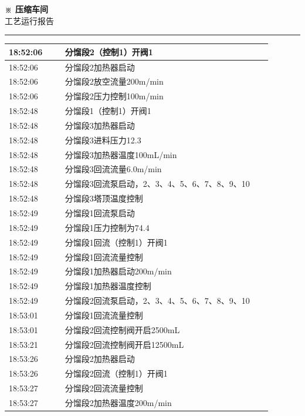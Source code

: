 \documentclass[UTF8,10pt,a4paper,fontset=fandol]{ctexart}
\begin{document}
\newpage

\begin{center}
\begin{minipage}[t]{0.47\linewidth}
\centering
\textbf{※ 压缩车间}\\[-1mm]
工艺运行报告

\vspace{1mm}
\hrule
\vspace{1mm}

\scriptsize
\begin{tabular}{|p{0.19\linewidth}|p{0.70\linewidth}|}
\hline
18:52:06 & 分馏段2（控制1）开阀1 \\ \hline
18:52:06 & 分馏段2加热器启动 \\ \hline
18:52:06 & 分馏段2放空流量200m/min \\ \hline
18:52:06 & 分馏段2压力控制100m/min \\ \hline
18:52:48 & 分馏段1（控制1）开阀1 \\ \hline
18:52:48 & 分馏段3加热器启动 \\ \hline
18:52:48 & 分馏段3进料压力12.3 \\ \hline
18:52:48 & 分馏段3加热器温度100mL/min \\ \hline
18:52:48 & 分馏段3回流流量6.0m/min \\ \hline
18:52:48 & 分馏段3回流泵启动，2、3、4、5、6、7、8、9、10 \\ \hline
18:52:48 & 分馏段3塔顶温度控制 \\ \hline
18:52:49 & 分馏段1回流泵启动 \\ \hline
18:52:49 & 分馏段1压力控制为74.4 \\ \hline
18:52:49 & 分馏段1回流（控制1）开阀1 \\ \hline
18:52:49 & 分馏段1回流流量控制 \\ \hline
18:52:49 & 分馏段1加热器启动200m/min \\ \hline
18:52:49 & 分馏段1加热器温度控制 \\ \hline
18:52:49 & 分馏段2回流泵启动，2、3、4、5、6、7、8、9、10 \\ \hline
18:53:01 & 分馏段1回流流量控制 \\ \hline
18:53:01 & 分馏段2回流控制阀开启2500mL \\ \hline
18:53:21 & 分馏段2回流控制阀开启12500mL \\ \hline
18:53:26 & 分馏段2加热器启动 \\ \hline
18:53:26 & 分馏段2回流（控制1）开阀1 \\ \hline
18:53:27 & 分馏段2回流流量控制 \\ \hline
18:53:27 & 分馏段2加热器温度200m/min \\ \hline
\end{tabular}


\end{minipage}
\end{center}
\end{document}
